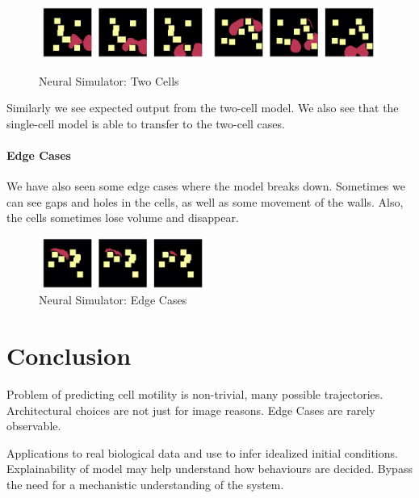 \documentclass[a4paper,10pt,twocolumn]{article}
\begin{document}
            \begin{figure}[H]\centering
                \includegraphics[width=0.49\textwidth]{../images/run_22.png}
                \includegraphics[width=0.49\textwidth]{../images/run_12.png}
                \caption{Neural Simulator: Two Cells}
            \end{figure}
            Similarly we see expected output from the two-cell model. We also see that the
            single-cell model is able to transfer to the two-cell cases.
            
            \paragraph{Edge Cases}
            We have also seen some edge cases where the model breaks down.
            Sometimes we can see gaps and holes in the cells, as well as some movement of the walls.
            Also, the cells sometimes lose volume and disappear.
            \begin{figure}[H]\centering
                \includegraphics[width=0.49\textwidth]{../images/run_5.png}
                \caption{Neural Simulator: Edge Cases}
            \end{figure}

    \section{Conclusion}
        Problem of predicting cell motility is non-trivial, many possible trajectories.
        Architectural choices are not just for image reasons.
        Edge Cases are rarely observable.

        Applications to real biological data and use to infer idealized initial conditions.
        Explainability of model may help understand how behaviours are decided.
        Bypass the need for a mechanistic understanding of the system.

    
    
    
\end{document}
